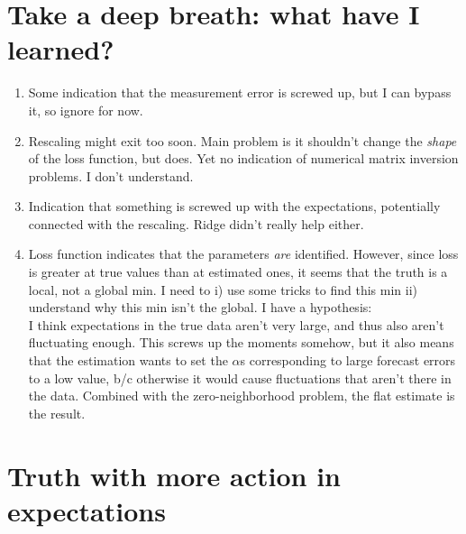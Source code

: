 \documentclass[11pt]{article}
\renewcommand{\[}{\begin{equation}}
\renewcommand{\]}{\end{equation}}
\begin{document}
\section{Take a deep breath: what have I learned?}
\begin{enumerate}
\item Some indication that the measurement error is screwed up, but I can bypass it, so ignore for now.
\item Rescaling might exit too soon. Main problem is it shouldn't change the \emph{shape} of the loss function, but does. Yet no indication of numerical matrix inversion problems. I don't understand.
\item Indication that something is screwed up with the expectations, potentially connected with the rescaling. Ridge didn't really help either. 
\item Loss function indicates that the parameters \emph{are} identified. However, since loss is greater at true values than at estimated ones, it seems that the truth is a local, not a global min. I need to i) use some tricks to find this min ii) understand why this min isn't the global. I have a hypothesis: \\
I think expectations in the true data aren't very large, and thus also aren't fluctuating enough. This screws up the moments somehow, but it also means that the estimation wants to set the $\alpha$s corresponding to large forecast errors to a low value, b/c otherwise it would cause fluctuations that aren't there in the data. Combined with the zero-neighborhood problem, the flat estimate is the result.
\end{enumerate}

\clearpage
\section{Truth with more action in expectations}
\end{document}
